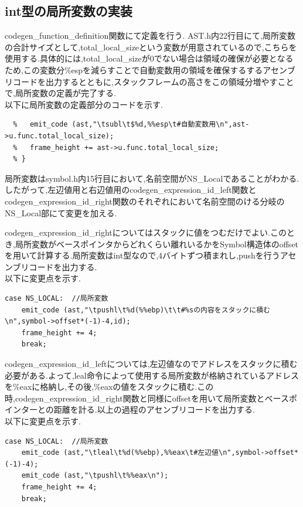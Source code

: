 \documentclass[10pt]{jsarticle}
\begin{document}
\subsection{int型の局所変数の実装}
codegen\_function\_definition関数にて定義を行う. AST.h内22行目にて,局所変数の合計サイズとして,total\_local\_sizeという変数が用意されているので,こちらを使用する.具体的には,total\_local\_sizeが0でない場合は領域の確保が必要となるため,この変数分\%espを減らすことで自動変数用の領域を確保するするアセンブリコードを出力するとともに,スタックフレームの高さをこの領域分増やすことで,局所変数の定義が完了する.\\
以下に局所変数の定義部分のコードを示す.
\begin{lstlisting}[caption=局所変数の定義]
  % if(ast->u.func.total_local_size != 0){
  %   emit_code (ast,"\tsubl\t$%d,%%esp\t#自動変数用\n",ast->u.func.total_local_size);
  %   frame_height += ast->u.func.total_local_size;
  % }
\end{lstlisting}

\par 局所変数はsymbol.h内15行目において,名前空間がNS\_Localであることがわかる.したがって,左辺値用と右辺値用のcodegen\_expression\_id\_left関数とcodegen\_expression\_id\_right関数のそれぞれにおいて名前空間のける分岐のNS\_Local部にて変更を加える. \\
\par codegen\_expression\_id\_rightについてはスタックに値をつむだけでよい.このとき,局所変数がベースポインタからどれくらい離れいるかをSymbol構造体のoffsetを用いて計算する.局所変数はint型なので,4バイトずつ積まれし,pushを行うアセンブリコードを出力する.\\
以下に変更点を示す.
\newpage
\begin{lstlisting}[caption=codegen\_expression\_id\_right関数内における局所変数]
  case NS_LOCAL:  //局所変数
    emit_code (ast,"\tpushl\t%d(%%ebp)\t\t#%sの内容をスタックに積む\n",symbol->offset*(-1)-4,id);
    frame_height += 4;
    break;
\end{lstlisting}

\par codegen\_expression\_id\_leftについては,左辺値なのでアドレスをスタックに積む必要がある.よって,leal命令によって使用する局所変数が格納されているアドレスを\%eaxに格納し,その後,\%eaxの値をスタックに積む.この時,codegen\_expression\_id\_right関数と同様にoffsetを用いて局所変数とベースポインターとの距離を計る.以上の過程のアセンブリコードを出力する.\\
以下に変更点を示す.
\begin{lstlisting}[caption=codegen\_expression\_id\_left関数内における局所変数]
  case NS_LOCAL:  //局所変数
    emit_code (ast,"\tleal\t%d(%%ebp),%%eax\t#左辺値\n",symbol->offset*(-1)-4);
    emit_code (ast,"\tpushl\t%%eax\n");
    frame_height += 4;
    break;
\end{lstlisting}
\end{document}
